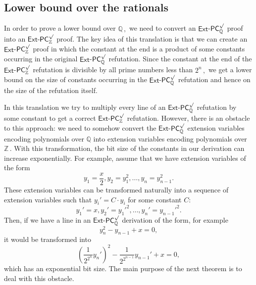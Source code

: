 \documentclass[11pt]{article}
\newcommand{\Q}{{\mathbb Q}}
\newcommand{\Z}{{\mathbb Z}}
\begin{document}
%
\subsection{Lower bound over the rationals}  %
In order to prove a lower bound over %
$\Q\,,$ %
 we need to convert an $\mathsf{Ext}$-$\mathsf{PC}^{\surd}_{\Q}$ proof into an $\mathsf{Ext}$-$\mathsf{PC}^{\surd}_{\Z}$ proof. The key idea of this translation is that we can create an $\mathsf{Ext}$-$\mathsf{PC}^{\surd}_{\Z}$ proof in which the constant at %
the end is a product of some constants occurring in the original $\mathsf{Ext}$-$\mathsf{PC}^{\surd}_{\Q}$ refutation. Since the constant at %
the end of the $\mathsf{Ext}$-$\mathsf{PC}^{\surd}_{\Z}$ refutation is divisible by all prime numbers less than %
$2^n\,,$ %
 we get a lower bound on the size of constants occurring in the $\mathsf{Ext}$-$\mathsf{PC}^{\surd}_{\Q}$ refutation and hence on the size of the refutation itself.

In this translation we try to multiply every line of an $\mathsf{Ext}$-$\mathsf{PC}^{\surd}_{\Q}$ refutation by some constant to get a correct $\mathsf{Ext}$-$\mathsf{PC}^{\surd}_{\Z}$ refutation. However, there is an obstacle to this approach: we need to somehow convert the $\mathsf{Ext}$-$\mathsf{PC}^{\surd}_{\Q}$ extension variables encoding polynomials over $\Q$ into extension variables encoding polynomials over %
$\Z\,.$ %
 With this transformation, the bit size of the constants in our derivation can increase exponentially. For example, assume that we have extension variables of the form
$$
y_1 = \frac{x}{2}, y_2 = y_1^2, \ldots, y_n = y_{n - 1}^2.
$$
These extension variables can be transformed naturally into a sequence of extension variables such that $y_i' = C \cdot y_i$ for some constant $C$: 
$$
y_1' = x, y_2' = y_1'^2, \ldots, y_n' = y_{n - 1}'^2.
$$
Then, if we have a line in an $\mathsf{Ext}$-$\mathsf{PC}^{\surd}_{\Q}$ derivation of the form, for example
$$
y_n^2 - y_{n - 1} + x = 0,
$$
it would be transformed into 
$$
\left(\frac{1}{2^{2^n}}y_n'\right)^2 - \frac{1}{2^{2^{n - 1}}}y_{n - 1}' + x = 0,
$$
which has an exponential bit size. 
%
The main purpose of the next theorem is to deal with this obstacle.
\end{document}
